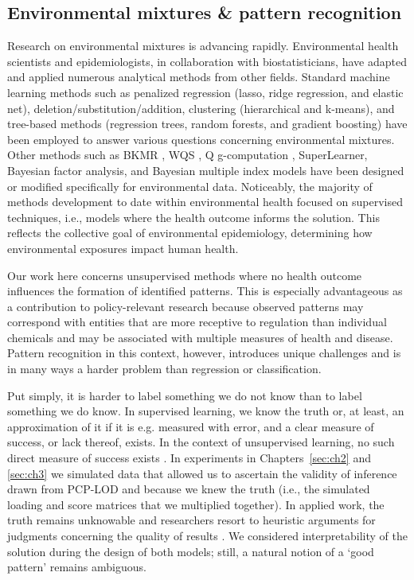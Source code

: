 \subsection{Environmental mixtures \& pattern recognition}
\label{sec:mixtures}
Research on environmental mixtures is advancing rapidly. Environmental health scientists and epidemiologists, in collaboration with biostatisticians, have adapted and applied numerous analytical methods from other fields. Standard machine learning methods such as penalized regression (lasso, ridge regression, and elastic net), deletion/substitution/addition, clustering (hierarchical and k-means), and tree-based methods (regression trees, random forests, and gradient boosting) have been employed to answer various questions concerning environmental mixtures. Other methods such as BKMR \citep{bobb2014bayesian, bobb2018statistical}, WQS \citep{carrico15}, Q g-computation \citep{keil2020quantile}, SuperLearner, Bayesian factor analysis, and Bayesian multiple index models have been designed or modified specifically for environmental data. Noticeably, the majority of methods development to date within environmental health focused on supervised techniques, i.e., models where the health outcome informs the solution. This reflects the collective goal of environmental epidemiology, determining how environmental exposures impact human health.

Our work here concerns unsupervised methods where no health outcome influences the formation of identified patterns. This is especially advantageous as a contribution to policy-relevant research because observed patterns may correspond with entities that are more receptive to regulation than individual chemicals and may be associated with multiple measures of health and disease. Pattern recognition in this context, however, introduces unique challenges and is in many ways a harder problem than regression or classification.

Put simply, it is harder to label something we do not know than to label something we do know. In supervised learning, we know the truth or, at least, an approximation of it if it is e.g. measured with error, and a clear measure of success, or lack thereof, exists. In the context of unsupervised learning, no such direct measure of success exists \citep{ISLR}. In experiments in Chapters~\ref{sec:ch2} and \ref{sec:ch3} we simulated data that allowed us to ascertain the validity of inference drawn from PCP-LOD and \bnmf because we knew the truth (i.e., the simulated loading and score matrices that we multiplied together). In applied work, the truth remains unknowable and researchers resort to heuristic arguments for judgments concerning the quality of results \citep{friedman2001elements}. We considered interpretability of the solution during the design of both models; still, a natural notion of a `good pattern' remains ambiguous. 

